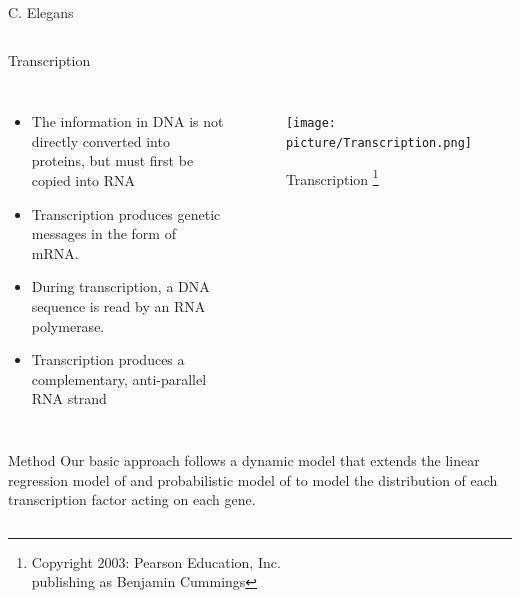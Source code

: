 \documentclass[serif,mathserif,final]{beamer}
\begin{document}
\begin{frame}{}
\begin{columns}[t]
\begin{column}{0.24\linewidth}
\begin{block}{C. Elegans}
\begin{columns}[c]
	\end{columns}

      \end{block}

      \begin{block}{Transcription}
       
	  \begin{columns}[c] %
	  \begin{itemize}
	  \item The information in DNA is not directly converted into proteins, but must first be copied into RNA
	  \item Transcription produces genetic messages in the form of mRNA.
	  \item During transcription, a DNA sequence is read by an RNA polymerase. 
	  \item Transcription produces a complementary, anti-parallel RNA strand
	  \end{itemize}


	  \begin{figure}[!htb]
	  \centering
	  \texttt{[image: picture/Transcription.png]}
	  \caption{Transcription \footnote{Copyright 2003: Pearson Education, Inc. \\ publishing as Benjamin Cummings}}
	  \label{fig:transcription}
	  \end{figure}

	  \end{columns}
       
      \end{block}

     \begin{block}{Method}
	  Our basic approach follows a dynamic model that extends the linear 
	  regression model of  \cite{p1}  and 
	  probabilistic model of  \cite{p2} to model the distribution 
	  of each transcription factor acting on each gene.
       
      \end{block}
    

\end{column}
\end{columns}
\end{frame}
\end{document}
